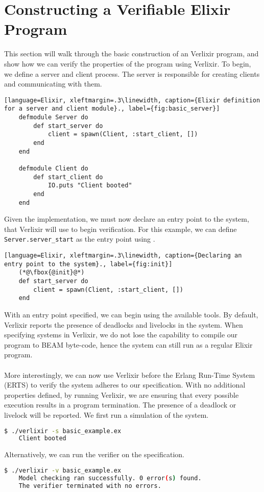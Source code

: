 \section{Constructing a Verifiable Elixir Program} \label{sec:verifiable}
This section will walk through the basic construction of an Verlixir program, and show how we can verify the properties of the program using Verlixir. To begin, we define a server and client process. The server is responsible for creating clients and communicating with them. 
\begin{lstlisting}[language=Elixir, xleftmargin=.3\linewidth, caption={Elixir definition for a server and client module}., label={fig:basic_server}]
    defmodule Server do
        def start_server do
            client = spawn(Client, :start_client, [])
        end
    end

    defmodule Client do
        def start_client do
            IO.puts "Client booted"
        end
    end
\end{lstlisting}
Given the implementation, we must now declare an entry point to the system, that Verlixir will use to begin verification. For this example, we can define \texttt{Server.server\_start} as the entry point using \textbf{\@init}.

\begin{lstlisting}[language=Elixir, xleftmargin=.3\linewidth, caption={Declaring an entry point to the system}., label={fig:init}]
    (*@\fbox{@init}@*)
    def start_server do
        client = spawn(Client, :start_client, [])
    end
\end{lstlisting}
With an entry point specified, we can begin using the available tools. By default, Verlixir reports the presence of deadlocks and livelocks in the system. When specifying systems in Verlixir, we do not lose the capability to compile our program to BEAM byte-code, hence the system can still run as a regular Elixir program.
\\ \\
More interestingly, we can now use Verlixir before the Erlang Run-Time System (ERTS) to verify the system adheres to our specification. With no additional properties defined, by running Verlixir, we are ensuring that every possible execution results in a program termination. The presence of a deadlock or livelock will be reported. We first run a simulation of the system.
\begin{lstlisting}[language=bash, xleftmargin=.3\linewidth]
    $ ./verlixir -s basic_example.ex 
    Client booted
\end{lstlisting}
Alternatively, we can run the verifier on the specification.
\begin{lstlisting}[language=bash, xleftmargin=.3\linewidth]
    $ ./verlixir -v basic_example.ex 
    Model checking ran successfully. 0 error(s) found.
    The verifier terminated with no errors.
\end{lstlisting}
